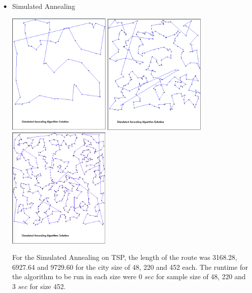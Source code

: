 \documentclass[12pt]{article}
\begin{document}
\begin{itemize}
\item Simulated Annealing
		\begin{center}
			\includegraphics[width=5cm]{Simulated48.PNG}
            \includegraphics[width=5cm]{Simulated220.PNG}
            \includegraphics[width=5cm]{Simulated452.png}
		\end{center}
        
For the Simulated Annealing on TSP, the length of the route was 3168.28, 6927.64 and 9729.60 for the city size of 48, 220 and 452 each. The runtime for the algorithm to be run in each size were 0 $sec$ for sample size of 48, 220 and 3 $sec$ for size 452. 


\end{itemize}
\end{document}
